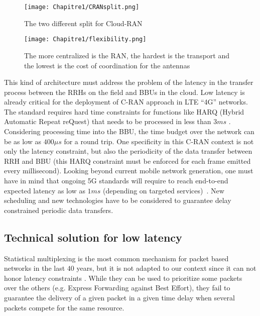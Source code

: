       
   \begin{figure}[h]
      \begin{center}
      \texttt{[image: Chapitre1/CRANsplit.png]}
      \end{center}
      \caption{The two different split for Cloud-RAN}\label{fig:CRANsplit}
      \end{figure}
      \begin{figure}[h]
      \begin{center}
      \texttt{[image: Chapitre1/flexibility.png]}
      \end{center}
      \caption{The more centralized is the RAN, the hardest is the transport and the lowest is the cost of coordination for the antennas}\label{fig:flexibility}
      \end{figure}
       
This kind of architecture must address the problem of the latency in the transfer process between the RRHs on the field and BBUs in the cloud. Low latency is already critical for the deployment of C-RAN approach in LTE “4G” networks. The standard requires hard time constraints for functions like HARQ (Hybrid Automatic Repeat reQuest) that needs to be processed in less than $3ms$ \cite{bouguen2012lte}. Considering processing time into the BBU, the time budget over the network can be as low as $400\mu s$ for a round trip. One specificity in this C-RAN context is not only the latency constraint, but also the periodicity of the data transfer between RRH and BBU (this HARQ constraint must be enforced for each frame emitted every millisecond). Looking beyond current mobile network generation, one must have in mind that ongoing 5G standards will require to reach end-to-end expected latency as low as $1ms$ (depending on targeted services)~\cite{boccardi2014five}. New scheduling and new technologies have to be considered to guarantee delay constrained periodic data transfers. 


\subsection{Technical solution for low latency}
Statistical multiplexing is the most common mechanism for packet based networks in the last $40$ years, but it is not adapted to our context since it can not honor latency constraints \cite{khaunte2003technique}. While they can be used to prioritize some packets over the others (e.g. Express Forwarding against Best Effort), they fail to guarantee the delivery of a given packet in a given time delay when several packets compete for the same resource. 

